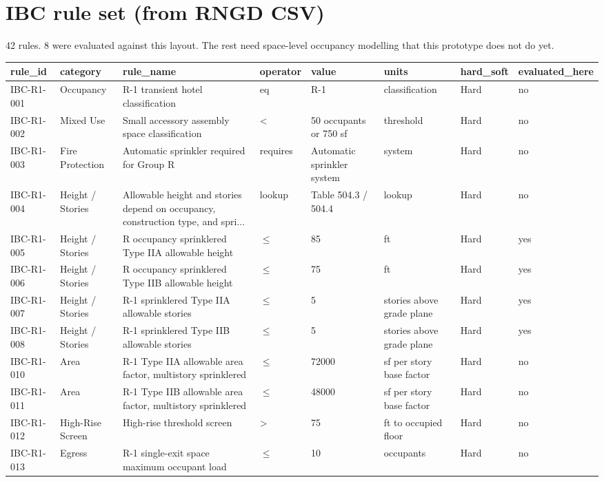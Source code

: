 \documentclass[10pt]{article}
\begin{document}
\section{IBC rule set (from RNGD CSV)}
42 rules. 8 were evaluated against this layout. The rest need space-level
occupancy modelling that this prototype does not do yet.
\begin{longtable}{p{1.6cm}p{2.6cm}p{5.2cm}p{1.1cm}p{1.6cm}p{1.3cm}p{1.3cm}p{1.5cm}}
\toprule
rule\_id & category & rule\_name & operator & value & units & hard\_soft & evaluated\_here \\ \midrule \endhead
IBC-R1-001 & Occupancy & R-1 transient hotel classification & eq & R-1 & classification & Hard & no \\
IBC-R1-002 & Mixed Use & Small accessory assembly space classification & < & 50 occupants or 750 sf & threshold & Hard & no \\
IBC-R1-003 & Fire Protection & Automatic sprinkler required for Group R & requires & Automatic sprinkler system & system & Hard & no \\
IBC-R1-004 & Height / Stories & Allowable height and stories depend on occupancy, construction type, and spri... & lookup & Table 504.3 / 504.4 & lookup & Hard & no \\
IBC-R1-005 & Height / Stories & R occupancy sprinklered Type IIA allowable height & $\le$ & 85 & ft & Hard & yes \\
IBC-R1-006 & Height / Stories & R occupancy sprinklered Type IIB allowable height & $\le$ & 75 & ft & Hard & yes \\
IBC-R1-007 & Height / Stories & R-1 sprinklered Type IIA allowable stories & $\le$ & 5 & stories above grade plane & Hard & yes \\
IBC-R1-008 & Height / Stories & R-1 sprinklered Type IIB allowable stories & $\le$ & 5 & stories above grade plane & Hard & yes \\
IBC-R1-010 & Area & R-1 Type IIA allowable area factor, multistory sprinklered & $\le$ & 72000 & sf per story base factor & Hard & no \\
IBC-R1-011 & Area & R-1 Type IIB allowable area factor, multistory sprinklered & $\le$ & 48000 & sf per story base factor & Hard & no \\
IBC-R1-012 & High-Rise Screen & High-rise threshold screen & > & 75 & ft to occupied floor & Hard & no \\
IBC-R1-013 & Egress & R-1 single-exit space maximum occupant load & $\le$ & 10 & occupants & Hard & no \\

\end{longtable}
\end{document}
